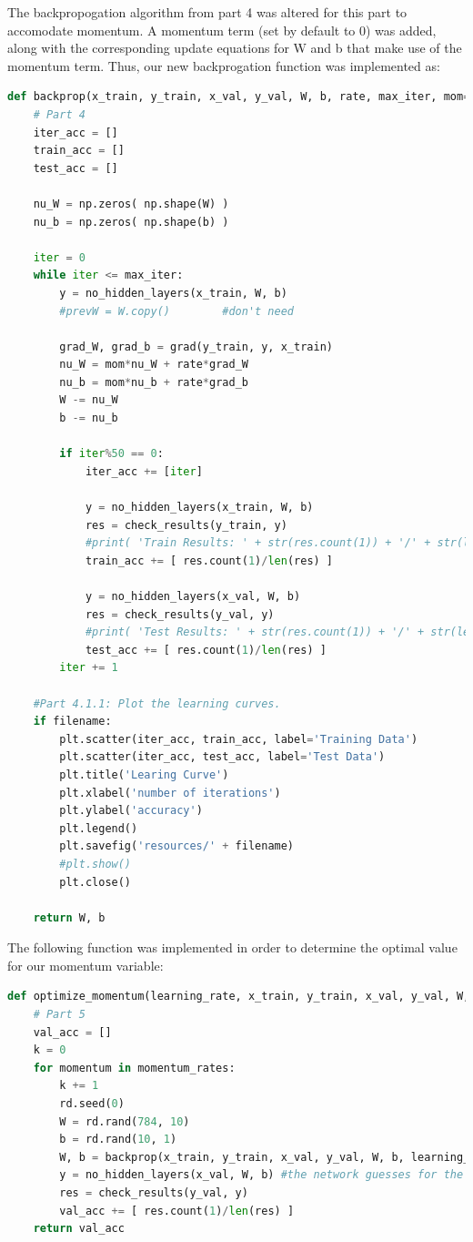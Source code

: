 \documentclass{article}
\begin{document}
  The backpropogation algorithm from part 4 was altered for this part to accomodate momentum.
  A momentum term (set by default to 0) was added, along with  the corresponding update equations
  for W and b that make use of the momentum term.  
 Thus, our new backprogation function was implemented as:
 \begin{lstlisting}[language=Python]
  	def backprop(x_train, y_train, x_val, y_val, W, b, rate, max_iter, mom=0, filename=''):
    # Part 4
    iter_acc = []
    train_acc = []
    test_acc = []
    
    nu_W = np.zeros( np.shape(W) )
    nu_b = np.zeros( np.shape(b) )
    
    iter = 0
    while iter <= max_iter:
        y = no_hidden_layers(x_train, W, b)
        #prevW = W.copy()        #don't need
        
        grad_W, grad_b = grad(y_train, y, x_train)
        nu_W = mom*nu_W + rate*grad_W
        nu_b = mom*nu_b + rate*grad_b
        W -= nu_W
        b -= nu_b
        
        if iter%50 == 0:
            iter_acc += [iter]
            
            y = no_hidden_layers(x_train, W, b)
            res = check_results(y_train, y)
            #print( 'Train Results: ' + str(res.count(1)) + '/' + str(len(res)) )
            train_acc += [ res.count(1)/len(res) ]
            
            y = no_hidden_layers(x_val, W, b)
            res = check_results(y_val, y)
            #print( 'Test Results: ' + str(res.count(1)) + '/' + str(len(res)) ) 
            test_acc += [ res.count(1)/len(res) ]
        iter += 1
    
    #Part 4.1.1: Plot the learning curves. 
    if filename:
        plt.scatter(iter_acc, train_acc, label='Training Data')
        plt.scatter(iter_acc, test_acc, label='Test Data')
        plt.title('Learing Curve')
        plt.xlabel('number of iterations')
        plt.ylabel('accuracy')
        plt.legend()
        plt.savefig('resources/' + filename)
        #plt.show()
        plt.close()
    
    return W, b
\end{lstlisting}

 The following function was implemented in order to determine the optimal value for our momentum variable:
 \begin{lstlisting}[language=Python]
  	def optimize_momentum(learning_rate, x_train, y_train, x_val, y_val, W, b, max_iter, momentum_rates):
    # Part 5
    val_acc = []
    k = 0
    for momentum in momentum_rates:
        k += 1
        rd.seed(0)  
        W = rd.rand(784, 10)
        b = rd.rand(10, 1)
        W, b = backprop(x_train, y_train, x_val, y_val, W, b, learning_rate, max_iter, momentum, filename='part5_optimize_momentum'+str(k)+'.jpg' )
        y = no_hidden_layers(x_val, W, b) #the network guesses for the validation set
        res = check_results(y_val, y)
        val_acc += [ res.count(1)/len(res) ]
    return val_acc
\end{lstlisting}
\end{document}
